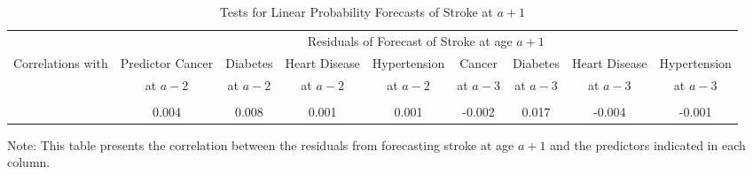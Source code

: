 \begin{landscape}
\begin{table}[H]
\begin{threeparttable}
\caption{Tests for Linear Probability Forecasts of Stroke at $a+1$} \label{table:1storderresidstroke}
\centering
\footnotesize
\begin{tabular}{l *{8}{c}}
\toprule
& \multicolumn{8}{c}{Residuals of Forecast of Stroke at age $a+1$} \\
Correlations with	&	Predictor Cancer &	Diabetes & Heart Disease &	Hypertension &	Cancer	& Diabetes & Heart Disease & Hypertension  \\
                    &	at $a-2$	&	at $a - 2$ & at $a - 2$	& at $a - 2$	& at $a-3$	& at $a - 3$	& at $a - 3$	& at $a - 3$ \\
\midrule \\
&	0.004 &	0.008	&	0.001	&	0.001	&	-0.002	&	0.017 &	-0.004 &	-0.001	\\
\bottomrule
\end{tabular}
\begin{tablenotes}
\footnotesize
\item Note: This table presents the correlation between the residuals from forecasting stroke at age $a+1$ and the predictors indicated in each column.
\end{tablenotes}
\end{threeparttable}
\end{table}
\end{landscape}

